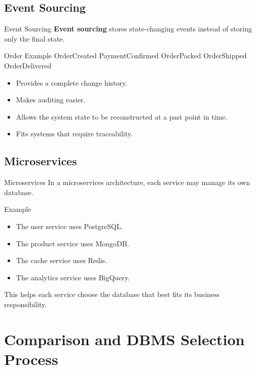 \documentclass[aspectratio=169,11pt]{beamer}
\newcommand{\keyword}[1]{\textcolor{accent}{\textbf{#1}}}
\newcommand{\kw}[1]{\keyword{#1}}
\newcommand{\smallitem}{\setlength{\itemsep}{2pt}\setlength{\parskip}{0pt}}
\begin{document}
\subsection{Event Sourcing}
\begin{frame}{Event Sourcing}
\kw{Event sourcing} stores state-changing events instead of storing only the final state.

\begin{block}{Order Example}
\ttfamily OrderCreated \quad PaymentConfirmed \quad OrderPacked \quad OrderShipped \quad OrderDelivered
\end{block}

\begin{itemize}
  \smallitem
  \item Provides a complete change history.
  \item Makes auditing easier.
  \item Allows the system state to be reconstructed at a past point in time.
  \item Fits systems that require traceability.
\end{itemize}
\end{frame}

\subsection{Microservices}
\begin{frame}{Microservices}
In a microservices architecture, each service may manage its own database.

\begin{exampleblock}{Example}
\begin{itemize}
  \smallitem
  \item The user service uses PostgreSQL.
  \item The product service uses MongoDB.
  \item The cache service uses Redis.
  \item The analytics service uses BigQuery.
\end{itemize}
\end{exampleblock}

This helps each service choose the database that best fits its business responsibility.
\end{frame}

\section{Comparison and DBMS Selection Process}
\end{document}
